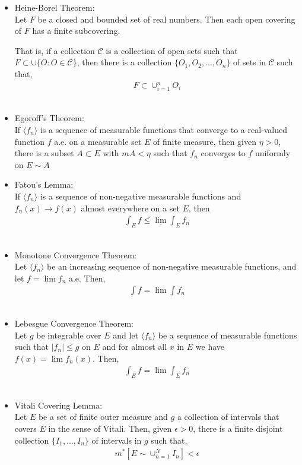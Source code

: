 \documentclass[12pt]{article}
\begin{document}
\begin{itemize}

\item Heine-Borel Theorem:\\

Let $F$ be a closed and bounded set of real numbers. Then each open covering of $F$ has a finite subcovering.

That is, if a collection $\mathscr{C}$ is a collection of open sets such that $F \subset \cup \{O: O \in \mathscr{C}\}$, then there is a collection $\{O_1, O_2, ..., O_n\}$ of sets in $\mathscr{C}$ such that,
\begin{align*}
F \subset \cup_{i=1}^n O_i
\end{align*}
\\
\item Egoroff's Theorem:\\

If $\langle f_n \rangle$ is a sequence of measurable functions that converge to a real-valued function $f$ a.e. on a measurable set $E$ of finite measure, then given $\eta > 0$, there is a subset $A \subset E$ with $mA < \eta$ such that $f_n$ converges to $f$ uniformly on $E \sim A$
\\
\item Fatou's Lemma:\\

If $\langle f_n \rangle$ is a sequence of non-negative measurable functions and $f_n(x) \to f(x)$ almost everywhere on a set $E$, then
\begin{align*}
\int_E f \leq \underline{\lim} \int_E f_n
\end{align*}
\\
\item Monotone Convergence Theorem:\\

Let $\langle f_n \rangle$ be an increasing sequence of non-negative measurable functions, and let $f = \lim f_n$ a.e. Then,
\begin{align*}
\int f = \lim \int f_n
\end{align*}
\\
\item Lebesgue Convergence Theorem:\\

Let $g$ be integrable over $E$ and let $\langle f_n \rangle$ be a sequence of measurable functions such that $|f_n| \leq g$ on $E$ and for almost all $x$ in $E$ we have $f(x) = \lim f_n(x)$. Then,
\begin{align*}
\int_E f = \lim \int_E f_n
\end{align*}
\\
\item Vitali Covering Lemma:\\

Let $E$ be a set of finite outer measure and $g$ a collection of intervals that covers $E$ in the sense of Vitali. Then, given $\epsilon > 0$, there is a finite disjoint collection $\{I_1, ..., I_n\}$ of intervals in $g$ such that,
\begin{align*}
m^*\left[E \sim \cup_{n=1}^N I_n\right] < \epsilon
\end{align*}
\end{itemize}
\end{document}

